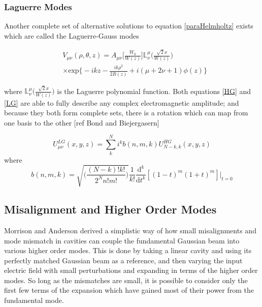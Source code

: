 		\subsubsection{Laguerre Modes}
		Another complete set of alternative solutions to equation \ref{paraHelmholtz} exists which are called the Laguerre-Gauss modes
		
		\begin{equation}\label{LG}
		\begin{aligned}
		&V_{\mu\nu}(\rho,\theta,z) = A_{\mu\nu}\bigg[ \frac{W_0}{W(z)} \bigg] \mathbb{L}^{\mu}_{\nu} \Bigg( \frac{\sqrt{2}x}{W(z)}  \Bigg) \\
		&\times \text{exp} \bigg\{-ikz-\frac{ik\rho^2}{2R(z)} + i(\mu+2\nu+1)\phi(z) \bigg\}
		\end{aligned}
		\end{equation}
		
		where $\mathbb{L}^{\mu}_{\nu} \Bigg( \frac{\sqrt{2}x}{W(z)}  \Bigg)$ is the Laguerre polynomial function. Both equations \ref{HG} and \ref{LG} are able to fully describe any complex electromagnetic amplitude; and because they both form complete sets, there is a rotation which can map from one basis to the other [ref Bond and Biejergasern]
		
		\begin{equation}
		U^{LG}_{\mu \nu} (x,y,z) = \sum\limits_{k}^{N} i^k b(n,m,k) U^{HG}_{N-k,k} (x,y,z)
		\end{equation}
		where
		\begin{equation}
		b(n,m,k) = \sqrt{\bigg( \frac{(N-k)!k!}{2^N n!m!} \bigg)} \frac{1}{k!} \frac{\text{d}^k}{\text{d}t^k}[(1-t)^m (1+t)^m]\vert_{t=0}
		\end{equation}

		\subsection{Misalignment and Higher Order Modes}\label{Misalign}
		Morrison and Anderson \cite{Anderson} \cite{Morrison} derived a simplistic way of how small misalignments and mode mismatch in cavities can couple the fundamental Gaussian beam into various higher order modes.  This is done by taking a linear cavity and using its perfectly matched Gaussian beam as a reference, and then varying the input electric field with small perturbations and expanding in terms of the higher order modes.  So long as the mismatches are small, it is possible to consider only the first few terms of the expansion which have gained most of their power from the fundamental mode.
		
